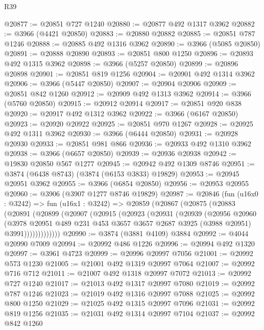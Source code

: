 \begin{lexlean}{R39}
\begin{coremodule}
@20877 := @20851 @727 @1240
@20880 := @20877 @492 @1317 @3962
@20882 := @3966 (@4421 @20850)
@20883 := @20880 @20882
@20885 := @20851 @787 @1246
@20888 := @20885 @492 @1316 @3962
@20890 := @3966 (@5085 @20850)
@20891 := @20888 @20890
@20893 := @20851 @800 @1250
@20896 := @20893 @492 @1315 @3962
@20898 := @3966 (@5257 @20850)
@20899 := @20896 @20898
@20901 := @20851 @819 @1256
@20904 := @20901 @492 @1314 @3962
@20906 := @3966 (@5447 @20850)
@20907 := @20904 @20906
@20909 := @20851 @842 @1260
@20912 := @20909 @492 @1313 @3962
@20914 := @3966 (@5760 @20850)
@20915 := @20912 @20914
@20917 := @20851 @920 @838
@20920 := @20917 @492 @1312 @3962
@20922 := @3966 (@6167 @20850)
@20923 := @20920 @20922
@20925 := @20851 @970 @1267
@20928 := @20925 @492 @1311 @3962
@20930 := @3966 (@6444 @20850)
@20931 := @20928 @20930
@20933 := @20851 @981 @866
@20936 := @20933 @492 @1310 @3962
@20938 := @3966 (@6657 @20850)
@20939 := @20936 @20938
@20942 := @19830 @20850 @567 @1277
@20945 := @20942 @492 @1309 @8746
@20951 := @3874 (@6438 @8743) (@3874 (@6153 @3833) @19829)
@20953 := @20945 @20951 @3962
@20955 := @3966 (@6854 @20850)
@20956 := @20953 @20955
@20960 := @3906 (@3907 @1277 @8746 @19829)
@20987 := @20846
    (fun (u16x0 : @3242) =>
    fun (u16x1 : @3242) =>
    @20859
      (@20867
        (@20875
          (@20883
            (@20891
              (@20899
                (@20907
                  (@20915
                    (@20923
                      (@20931
                        (@20939
                          (@20956
                            @20960
                            (@3978
                              @20951
                              @489
                              @231
                              @453
                              @3657
                              @3657
                              @2687
                              @3925
                              (@3988 @20951)
                              @3991)))))))))))))
@20990 := @3874 (@3881 @4109) @3884
@20992 := @4044 @20990 @7009
@20994 := @20992 @486 @1226
@20996 := @20994 @492 @1320
@20997 := @3961 @4723
@20999 := @20996 @20997 @7056
@21001 := @20992 @573 @1230
@21005 := @21001 @492 @1319 @20997 @7064
@21007 := @20992 @716 @712
@21011 := @21007 @492 @1318 @20997 @7072
@21013 := @20992 @727 @1240
@21017 := @21013 @492 @1317 @20997 @7080
@21019 := @20992 @787 @1246
@21023 := @21019 @492 @1316 @20997 @7088
@21025 := @20992 @800 @1250
@21029 := @21025 @492 @1315 @20997 @7096
@21031 := @20992 @819 @1256
@21035 := @21031 @492 @1314 @20997 @7104
@21037 := @20992 @842 @1260

\end{coremodule}
\end{lexlean}

